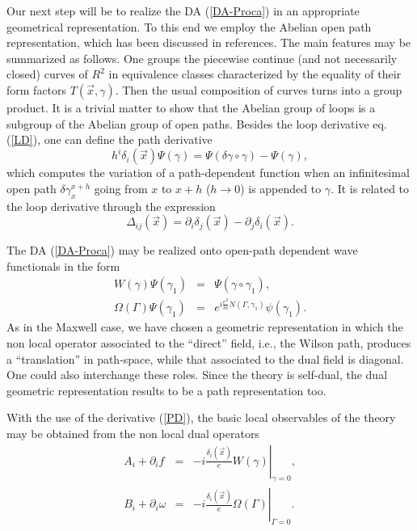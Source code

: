 \documentclass[a4paper,12pt]{article}
\newcommand{\eref}[1]{(\ref{#1})}
\begin{document}
Our next step will be to
realize the DA \eref{DA-Proca} in an appropriate geometrical
representation. To this end we employ the Abelian open path
representation, which has been discussed in
references\cite{LRC,Rolando}. The main features may be summarized
as follows. One groups the piecewise continue (and not
necessarily closed) curves of $R^2$ in equivalence classes
characterized by the equality of their form factors $T(\vec
x,\gamma)$. Then the usual composition of curves turns into a
group product. It is a trivial matter to show that the Abelian
group of loops is a subgroup of the Abelian group of open paths.
Besides the loop derivative eq. \eref{LD}, one can define the
path derivative\cite{LRC,LO}
\begin{equation}
h^i\delta_i(\vec x)\Psi(\gamma)=\Psi(\delta\gamma\circ\gamma)-
\Psi(\gamma),\label{PD}
\end{equation}
which computes the variation of a path-dependent function when an
infinitesimal open path $\delta\gamma_x^{x+h}$ going from $x$ to
$x+h$ ($h\rightarrow 0$) is appended to $\gamma$. It is related to
the loop derivative through the expression
\begin{equation}
\Delta_{ij}(\vec x)=\partial_i\delta_j(\vec x)-\partial_j\delta_i(\vec x).
\end{equation}

The DA \eref{DA-Proca} may be realized onto open-path dependent wave functionals
in the form
\begin{eqnarray}
W(\gamma)\Psi(\gamma_1)&=&\Psi(\gamma\circ\gamma_1),\label{48}\\
\Omega(\Gamma)\Psi(\gamma_1)&=&e^{i{\frac {e^2}m}N(\Gamma,\gamma_1)}
\psi(\gamma_1).\label{49}
\end{eqnarray}
As in the Maxwell case, we have chosen a geometric representation in which
the non local operator associated to the ``direct'' field, i.e., the Wilson
path, produces a ``translation'' in path-space, while that associated to the
dual field is diagonal. One could also interchange these roles. Since the
theory is self-dual, the dual geometric representation results to be a path
representation too.

With the use of the derivative \eref{PD}, the basic local observables of the
theory may be obtained from the non local dual operators
\begin{eqnarray}
A_i+\partial_if& = &\left.-i{\frac {\delta_i(\vec x)}e}W(\gamma)
\right|_{\gamma=0},\\
B_i+\partial_i\omega& = &\left.-i{\frac {\delta_i(\vec
x)}e}\Omega(\Gamma) \right|_{\Gamma=0}.
\end{eqnarray}
\end{document}
